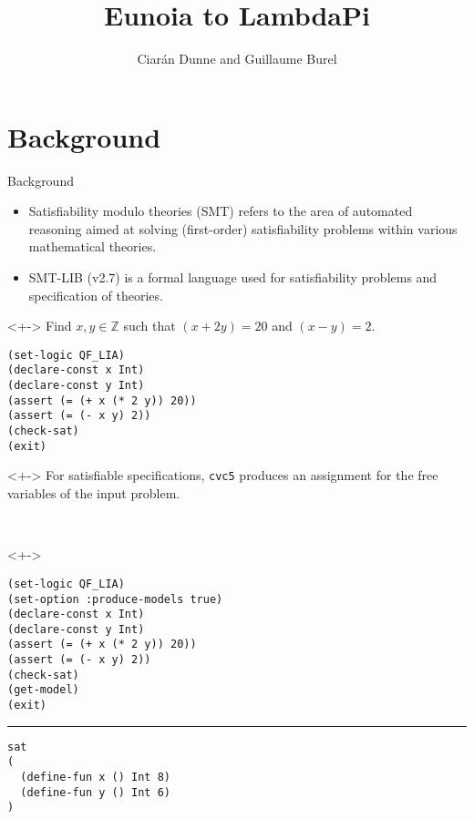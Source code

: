 \documentclass[lualatex, compress, 12pt]{beamer}
\title{Eunoia to LambdaPi}
\author{Ciarán Dunne and Guillaume Burel}
\institute{ENS Paris-Saclay, INRIA}
\begin{document}
\frame[plain]{\titlepage}

\section{Background}

\begin{frame}[fragile]{Background}
	\begin{itemize}
		\item<+-> \alert{Satisfiability modulo theories} (SMT) refers to the area
		      of automated reasoning aimed at solving (first-order) satisfiability
		      problems within various mathematical theories.
		\item<+-> \alert{SMT-LIB} (v2.7) is a formal language
		      used for satisfiability problems and specification
		      of theories.
	\end{itemize}
	\begin{uncoverenv}<+->
		\exxample
		Find $x,y ∈ ℤ$ such that $(x + 2y) = 20$ and $(x - y) = 2$.
		\begin{lstlisting}
(set-logic QF_LIA)
(declare-const x Int)
(declare-const y Int)
(assert (= (+ x (* 2 y)) 20))
(assert (= (- x y) 2))
(check-sat)
(exit)\end{lstlisting}
	\end{uncoverenv}
\end{frame}

\begin{frame}[fragile]
	\begin{uncoverenv}<+->
		For satisfiable specifications,
		\texttt{cvc5} produces an \alert{assignment} for the
		free variables of the input problem.
	\end{uncoverenv}
	\\[3mm]
	\begin{uncoverenv}<+->
		\exxample
		\begin{lstlisting}
(set-logic QF_LIA)
(set-option :produce-models true)
(declare-const x Int)
(declare-const y Int)
(assert (= (+ x (* 2 y)) 20))
(assert (= (- x y) 2))
(check-sat)
(get-model)
(exit)\end{lstlisting}
		\hrule
		\begin{lstlisting}
sat
(
  (define-fun x () Int 8)
  (define-fun y () Int 6)
)\end{lstlisting}
	\end{uncoverenv}
\end{frame}
\end{document}
